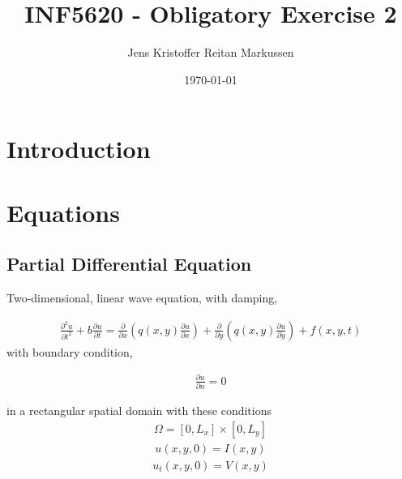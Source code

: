 \documentclass[11pt]{article}
\title{INF5620 - Obligatory Exercise 2}
\author{Jens Kristoffer Reitan Markussen}
\date{\today}
\begin{document}
 	\maketitle 
	
	\section{Introduction}
	
	
	\section{Equations}
		\subsection{Partial Differential Equation}
		Two-dimensional, linear wave equation, with 
		damping,

		\begin{align*}
		\frac{\partial^2u}{\partial t^2}
		+ b\frac{\partial u}{\partial t} 
		= \frac{\partial}{\partial x} 
		\left(q(x,y)\frac{\partial u}{\partial x}
		\right) + \frac{\partial}{\partial y}
		\left(q(x,y)\frac{\partial u}{\partial y}
		\right) + f(x,y,t)
		\end{align*}
		with boundary condition,
		
		\begin{align*}
		\frac{\partial u}{\partial n} = 0		
		\end{align*}				
		
		in a rectangular spatial domain 
		with these conditions
		\begin{align*}
		\Omega = [0, L_x] \times [0, L_y]
		\end{align*}
		\begin{align*}
		u(x,y,0) = I(x,y)
		\end{align*}
		\begin{align*}
		u_t(x,y,0) = V(x,y)
		\end{align*}
						
			
\end{document}

